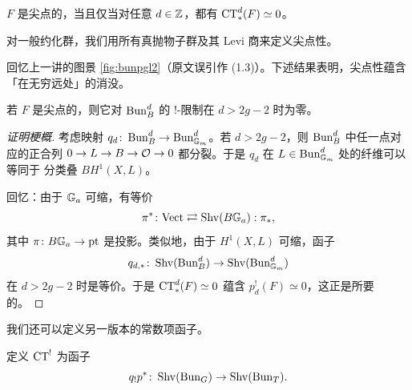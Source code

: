 \begin{remark}\label{rem:cusp-all-d}
\(F\) 是尖点的，当且仅当对任意 \(d\in\mathbb{Z}\)，都有 \(\operatorname{CT}^d_*(F)\simeq 0\)。
\end{remark}

\begin{remark}\label{rem:cusp-general}
对一般约化群，我们用所有真抛物子群及其 Levi 商来定义尖点性。
\end{remark}

回忆上一讲的图景 \eqref{fig:bunpgl2}（原文误引作 (1.3)）。下述结果表明，尖点性蕴含「在无穷远处」的消没。

\begin{proposition}\label{prop:cusp-vanish}
若 \(F\) 是尖点的，则它对 \(\operatorname{Bun}^d_B\) 的 \(!\)-限制在 \(d>2g-2\) 时为零。
\end{proposition}

\begin{proof}[证明梗概]
考虑映射 \(q_d\colon\operatorname{Bun}^d_B\to\operatorname{Bun}^d_{\mathbb{G}_m}\)。若 \(d>2g-2\)，则 \(\operatorname{Bun}^d_B\) 中任一点对应的正合列
\(0\to L\to B\to\mathcal{O}\to 0\) 都分裂。于是 \(q_d\) 在 \(L\in\operatorname{Bun}^d_{\mathbb{G}_m}\) 处的纤维可以等同于
分类叠 \(B H^1(X,L)\)。

回忆：由于 \(\mathbb{G}_a\) 可缩，有等价
\[
\pi^*\colon\mathrm{Vect}\rightleftarrows\operatorname{Shv}(B\mathbb{G}_a):\pi_*,
\]
其中 \(\pi\colon B\mathbb{G}_a\to\mathrm{pt}\) 是投影。类似地，由于 \(H^1(X,L)\) 可缩，函子
\[
q_{d,*}\colon\operatorname{Shv}(\operatorname{Bun}^d_B)\to\operatorname{Shv}(\operatorname{Bun}^d_{\mathbb{G}_m})
\]
在 \(d>2g-2\) 时是等价。于是 \(\operatorname{CT}^d_*(F)\simeq 0\) 蕴含 \(p^!_d(F)\simeq 0\)，这正是所要的。
\end{proof}

我们还可以定义另一版本的常数项函子。

\begin{definition}\label{def:ct!}
定义 \(\operatorname{CT}^!\) 为函子
\[
q_!p^*\colon\operatorname{Shv}(\operatorname{Bun}_G)\to\operatorname{Shv}(\operatorname{Bun}_T).
\]
\end{definition}

